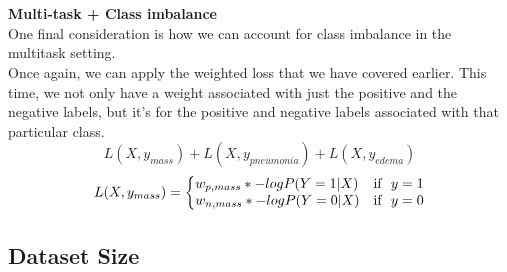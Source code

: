 \documentclass[a4paper,12pt]{article}
\begin{document}
\\\\
\textbf{Multi-task + Class imbalance}\\

One final consideration is how we can account for class imbalance in the multitask setting.\\
Once again, we can apply the weighted loss that we have covered earlier. This time, we not only have a weight associated with just the positive and the negative labels, but it's for the positive and negative labels associated with that particular class.\\
\[ L(X,y_{mass}) + L(X,y_{pneumonia}) + L(X,y_{edema}) \]
\begin{equation}
L(X,y_{mass})=\left\{
\begin{array}{@{}ll@{}}
w_{p,mass} * -log P(Y=1|X) & \text{if}\ \ y=1 \nonumber \\
w_{n,mass} * -log P(Y=0|X) & \text{if}\ \ y=0
\end{array}\right.
\end{equation}
\subsection{Dataset Size}
\end{document}
